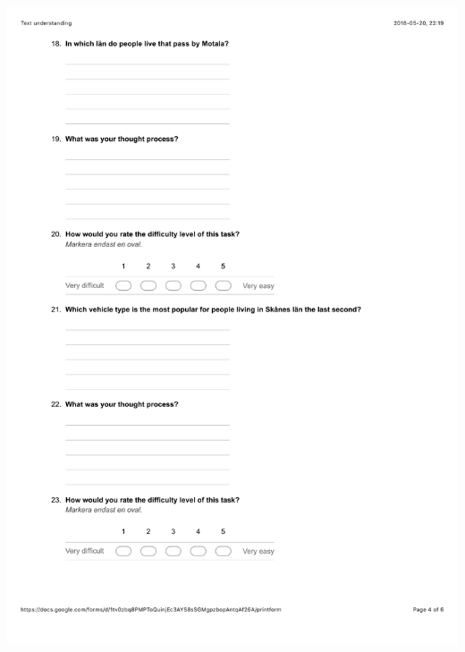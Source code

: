 \documentclass[12pt]{kththesis}
\begin{document}
\begin{appendices}
\includegraphics[width=1\textwidth]{TextUnderstanding4.pdf}

\end{appendices}
\end{document}
